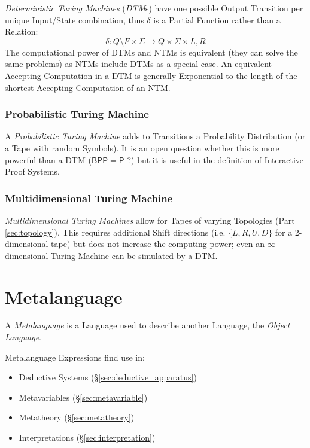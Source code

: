 \emph{Deterministic Turing Machines} (\emph{DTM}s) have one possible
Output Transition per unique Input/State combination, thus $\delta$ is
a Partial Function rather than a Relation:
\[
  \delta : Q \setminus F \times \Sigma \rightarrow Q \times
  \Sigma \times {L,R}
\]
The computational power of DTMs and NTMs is equivalent (they can solve
the same problems) as NTMs include DTMs as a special case. An
equivalent Accepting Computation in a DTM is generally Exponential to
the length of the shortest Accepting Computation of an NTM.



\subsubsection{Probabilistic Turing Machine}
\label{sec:probabilistic_turing_machine}

A \emph{Probabilistic Turing Machine} adds to Transitions a
Probability Distribution (or a Tape with random Symbols). It is an
open question whether this is more powerful than a DTM
($\mathsf{BPP}=\mathsf{P}$ ?)  but it is useful in the definition of
Interactive Proof Systems. %



\subsubsection{Multidimensional Turing Machine}
\label{sec:multidimensional_turing_machine}

\emph{Multidimensional Turing Machines} allow for Tapes of varying
Topologies (Part \ref{sec:topology}). This requires additional Shift
directions (i.e. $\{L, R, U, D\}$ for a 2-dimensional tape) but does
not increase the computing power; even an $\infty$-dimensional Turing
Machine can be simulated by a DTM.



\section{Metalanguage}\label{sec:metalanguage}

A \emph{Metalanguage} is a Language used to describe another Language,
the \emph{Object Language}.

Metalanguage Expressions find use in:
\begin{itemize}
  \item Deductive Systems (\S\ref{sec:deductive_apparatus})
  \item Metavariables (\S\ref{sec:metavariable})
  \item Metatheory (\S\ref{sec:metatheory})
  \item Interpretations (\S\ref{sec:interpretation})
\end{itemize}

